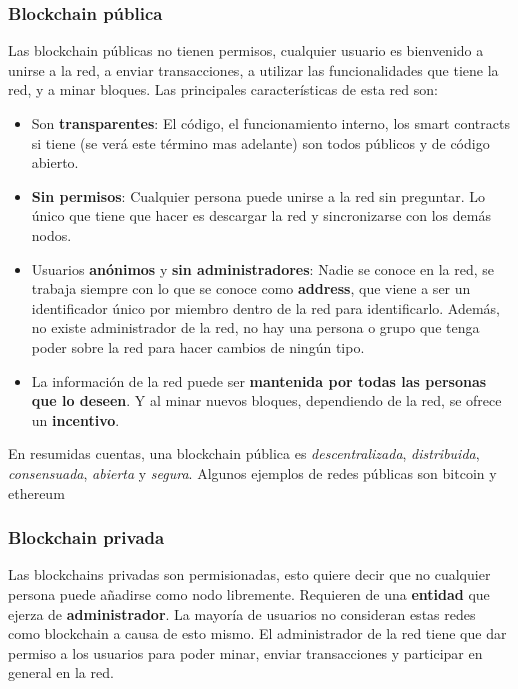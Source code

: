 \subsubsection{Blockchain pública}

Las blockchain públicas no tienen permisos, cualquier usuario es bienvenido a unirse a la red, a enviar transacciones, a utilizar las funcionalidades que tiene la red, y a minar bloques. Las principales características de esta red son:
\begin{itemize}
\item Son \textbf{transparentes}: El código, el funcionamiento interno, los smart contracts si tiene (se verá este término mas adelante) son todos públicos y de código abierto.
\item \textbf{Sin permisos}: Cualquier persona puede unirse a la red sin preguntar. Lo único que tiene que hacer es descargar la red y sincronizarse con los demás nodos.
\item Usuarios \textbf{anónimos} y \textbf{sin administradores}: Nadie se conoce en la red, se trabaja siempre con lo que se conoce como \textbf{address}, que viene a ser un identificador único por miembro dentro de la red para identificarlo. Además, no existe administrador de la red, no hay una persona o grupo que tenga poder sobre la red para hacer cambios de ningún tipo.
\item La información de la red puede ser \textbf{mantenida por todas las personas que lo deseen}. Y al minar nuevos bloques, dependiendo de la red, se ofrece un \textbf{incentivo}.
\end{itemize}

En resumidas cuentas, una blockchain pública es \emph{descentralizada}, \emph{distribuida}, \emph{consensuada}, \emph{abierta} y \emph{segura}. Algunos ejemplos de redes públicas son bitcoin\cite{webBitcoin} y ethereum\cite{webEthereum}

\subsubsection{Blockchain privada}

Las blockchains privadas son permisionadas, esto quiere decir que no cualquier persona puede añadirse como nodo libremente. Requieren de una \textbf{entidad} que ejerza de \textbf{administrador}. La mayoría de usuarios no consideran estas redes como blockchain a causa de esto mismo. El administrador de la red tiene que dar permiso a los usuarios para poder minar, enviar transacciones y participar en general en la red. \\

